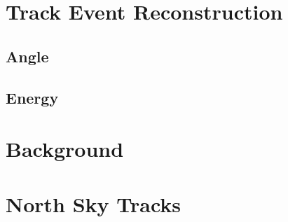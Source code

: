 \section{Track Event Reconstruction}

\subsection{Angle}

\subsection{Energy}

\section{Background}

\section{North Sky Tracks}
